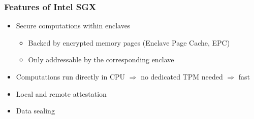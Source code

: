 \begin{frame}
    \frametitle{Features of Intel SGX}
    \begin{itemize}
        \item Secure computations within enclaves
        \begin{itemize}
            \item Backed by encrypted memory pages (Enclave Page Cache, EPC)
            \item Only addressable by the corresponding enclave
        \end{itemize}
        \item Computations run directly in CPU $\Rightarrow$ no dedicated TPM needed \newline $\Rightarrow$ fast
        \item Local and remote attestation
        \item Data sealing
    \end{itemize}
    

\end{frame}